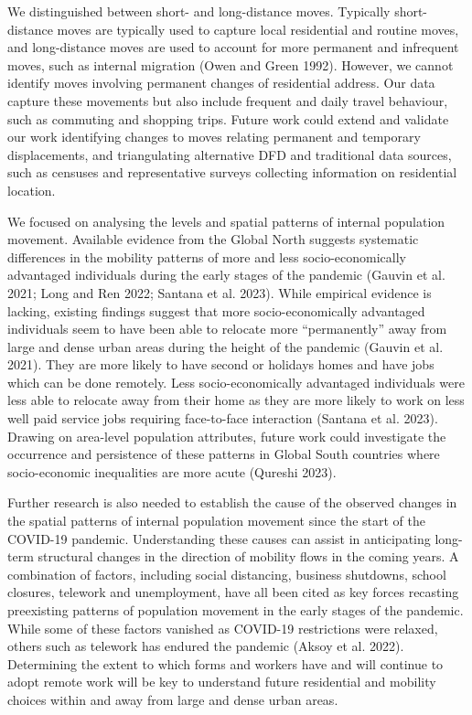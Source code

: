 \documentclass[
  11pt,
]{article}
\begin{document}
We distinguished between short- and long-distance moves. Typically
short-distance moves are typically used to capture local residential and
routine moves, and long-distance moves are used to account for more
permanent and infrequent moves, such as internal migration (Owen and
Green 1992). However, we cannot identify moves involving permanent
changes of residential address. Our data capture these movements but
also include frequent and daily travel behaviour, such as commuting and
shopping trips. Future work could extend and validate our work
identifying changes to moves relating permanent and temporary
displacements, and triangulating alternative DFD and traditional data
sources, such as censuses and representative surveys collecting
information on residential location.

We focused on analysing the levels and spatial patterns of internal
population movement. Available evidence from the Global North suggests
systematic differences in the mobility patterns of more and less
socio-economically advantaged individuals during the early stages of the
pandemic (Gauvin et al. 2021; Long and Ren 2022; Santana et al. 2023).
While empirical evidence is lacking, existing findings suggest that more
socio-economically advantaged individuals seem to have been able to
relocate more ``permanently'' away from large and dense urban areas
during the height of the pandemic (Gauvin et al. 2021). They are more
likely to have second or holidays homes and have jobs which can be done
remotely. Less socio-economically advantaged individuals were less able
to relocate away from their home as they are more likely to work on less
well paid service jobs requiring face-to-face interaction (Santana et
al. 2023). Drawing on area-level population attributes, future work
could investigate the occurrence and persistence of these patterns in
Global South countries where socio-economic inequalities are more acute
(Qureshi 2023).

Further research is also needed to establish the cause of the observed
changes in the spatial patterns of internal population movement since
the start of the COVID-19 pandemic. Understanding these causes can
assist in anticipating long-term structural changes in the direction of
mobility flows in the coming years. A combination of factors, including
social distancing, business shutdowns, school closures, telework and
unemployment, have all been cited as key forces recasting preexisting
patterns of population movement in the early stages of the pandemic.
While some of these factors vanished as COVID-19 restrictions were
relaxed, others such as telework has endured the pandemic (Aksoy et al.
2022). Determining the extent to which forms and workers have and will
continue to adopt remote work will be key to understand future
residential and mobility choices within and away from large and dense
urban areas.
\end{document}
